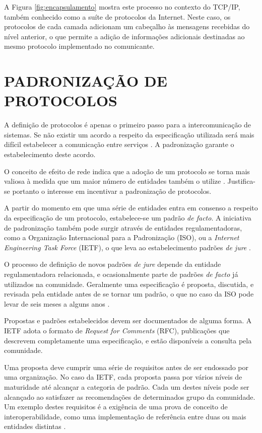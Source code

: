 \begin{apendicesenv}
A Figura \ref{fig:encapsulamento} mostra este processo no contexto do TCP/IP, também
conhecido como a suíte de protocolos da Internet. Neste caso, os protocolos de cada
camada adicionam um cabeçalho às mensagens recebidas do nível anterior, o que
permite a adição de informações adicionais destinadas ao mesmo protocolo
implementado no comunicante.



\section{PADRONIZAÇÃO DE PROTOCOLOS}

A definição de protocolos é apenas o primeiro passo para a intercomunicação de
sistemas. Se não existir um acordo a respeito da especificação utilizada será mais
difícil estabelecer a comunicação entre serviços \cite{kurose2012}. A padronização
garante o estabelecimento deste acordo.

\begin{sloppypar}
O conceito de efeito de rede indica que a adoção de um protocolo se torna mais
valiosa à medida que um maior número de entidades também o utilize
\cite{liebowitz1998}. Justifica-se portanto o interesse em incentivar a padronização
de protocolos.
\end{sloppypar}

A partir do momento em que uma série de entidades entra em consenso a respeito da
especificação de um protocolo, estabelece-se um padrão \textit{de facto}. A
iniciativa de padronização também pode surgir através de entidades regulamentadoras,
como a Organização Internacional para a Padronização (ISO), ou a \textit{Internet
Engineering Task Force} (IETF), o que leva ao estabelecimento padrões \textit{de
jure} \cite{tanenbaum2010}.

O processo de definição de novos padrões \textit{de jure} depende da entidade
regulamentadora relacionada, e ocasionalmente parte de padrões \textit{de facto} já
utilizados na comunidade. Geralmente uma especificação é proposta, discutida, e
revisada pela entidade antes de se tornar um padrão, o que no caso da ISO pode levar
de seis meses a alguns anos \cite{tanenbaum2010}.

Propostas e padrões estabelecidos devem ser documentados de alguma forma. A IETF
adota o formato de \textit{Request for Comments} (RFC), publicações que descrevem
completamente uma especificação, e estão disponíveis a consulta pela comunidade.

Uma proposta deve cumprir uma série de requisitos antes de ser endossado por uma
organização. No caso da IETF, cada proposta passa por vários níveis de maturidade
até alcançar a categoria de padrão. Cada um destes níveis pode ser alcançado ao
satisfazer as recomendações de determinados grupo da comunidade. Um exemplo destes
requisitos é a exigência de uma prova de conceito de interoperabilidade, como uma
implementação de referência entre duas ou mais entidades distintas \cite{rfc1280}.


\end{apendicesenv}
